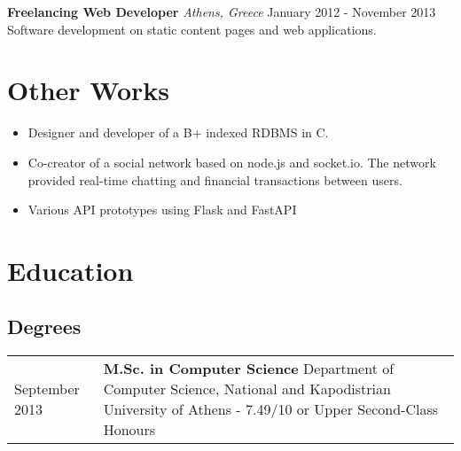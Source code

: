 \documentclass{article}
\begin{document}
        \begin{flushleft}
            \textbf{\large Freelancing Web Developer} \textit{\footnotesize Athens, Greece} \hfill \small January 2012 - November 2013 \newline
		Software development on static content pages and web applications. \newline
		     \\ [1ex]
        \end{flushleft}
	
	\vspace{+0.5cm}
	
		\section*{\color{NavyBlue}Other Works}
		\vspace{-0.5cm}
		{\color{NavyBlue}\hrulefill}
		\begin{itemize}
			\item Designer and developer of a B+ indexed RDBMS in C.
			\item Co-creator of a social network based on node.js and socket.io. The network provided real-time chatting and financial transactions between users.
                \item Various API prototypes using Flask and FastAPI
            \end{itemize}
                

        \section*{\color{NavyBlue} Education}
	\vspace{-0.5cm}
	{\color{NavyBlue} \hrulefill}
	
	\subsection*{Degrees}
	\begin{tabular}{p{2cm}  p{12cm}}
		\small September 2013 & \textbf{M.Sc. in Computer Science} \newline
			Department of Computer Science, National and Kapodistrian University of Athens - 7.49/10 or Upper Second-Class Honours
	\end{tabular}
\end{document}
